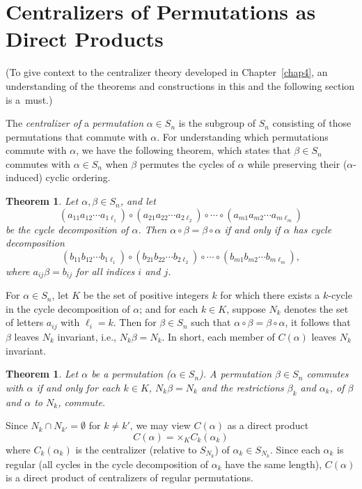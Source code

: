 \documentclass{surv-l}
\numberwithin{equation}{section}
\numberwithin{table}{section}
\numberwithin{figure}{section}
\newtheorem{theorem}[equation]{Theorem}
\theoremstyle{definition}
\begin{document}
\section{Centralizers of Permutations as Direct Products}\label{secA.73}

(To give context to the centralizer theory developed in
Chapter~\ref{chap4}, an understanding of the theorems and
constructions in this and the following section is a~must.)

The \emph{centralizer of} a \emph{permutation} $\alpha\in S_{n}$
is the subgroup of $S_{n}$ consisting of those permutations that
commute with $\alpha$. For understanding which permutations
commute with $\alpha$, we have the following theorem, which states
that $\beta\in S_{n}$ commutes with $\alpha\in S_{n}$ when $\beta$
permutes the cycles of $\alpha$ while preserving their
($\alpha$-induced) cyclic ordering.

\begin{theorem}\label{thmA.73.1}
Let $\alpha,\beta\in S_{n}$, and let
\[
(a_{11}a_{12}\cdots a_{1\ell_{1}})\circ(a_{21}a_{22}\cdots a_{2\ell_{2}})
\circ\cdots \circ (a_{m1}a_{m2}\cdots a_{m\ell_{m}})
\]
be the cycle decomposition of $\alpha$. Then $\alpha
\circ\beta=\beta \circ\alpha$ if and only if $\alpha$ has
cycle decomposition
\[
(b_{11}b_{12}\cdots b_{1\ell_{1}})\circ(b_{21}b_{22}\cdots b_{2\ell_{2}})
\circ\cdots \circ (b_{m1}b_{m2}\cdots b_{m\ell_{m}}),
\]
where $a_{ij}\beta=b_{ij}$ for all indices $i$ and $j$.
\end{theorem}

For $\alpha\in S_{n}$, let $K$ be the set of positive integers $k$
for which there exists a $k$-cycle in the cycle decomposition of
$\alpha$; and for each $k\in K$, suppose $N_{k}$ denotes the set
of letters $a_{ij}$ with $\ell_{i}=k$. Then for $\beta\in S_{n}$
such that $\alpha \circ\beta=\beta \circ\alpha$, it follows that
$\beta$ leaves $N_{k}$ invariant, i.e., $N_{k}\beta=N_{k}$. In
short, each member of $C(\alpha)$ leaves $N_{k}$ invariant.

\begin{theorem}\label{thmA.73.2}
Let $\alpha$ be a permutation ($\alpha\in S_{n}$). A
permutation $\beta\in S_{n}$ commutes with $\alpha$ if and
only for each $k\in K$, $N_{k}\beta=N_{k}$ and the restrictions
$\beta_{k}$ and $\alpha_{k}$, of $\beta$ and $\alpha$ to
$N_{k}$, commute.
\end{theorem}

Since $N_{k}\cap N_{k'}=\emptyset$ for $k\neq k'$, we may
view $C(\alpha)$ as a direct product
\[
C(\alpha)=\times {}_{K}C_{k}(\alpha_{k})
\]
where $C_{k}(\alpha_{k})$ is the centralizer (relative to
$S_{N_{k}}$) of $\alpha_{k}\in S_{N_{k}}$. Since each $\alpha_{k}$
is regular (all cycles in the cycle decomposition of $\alpha_{k}$
have the same length), $C(\alpha)$ is a direct product of
centralizers of regular permutations.
\end{document}

